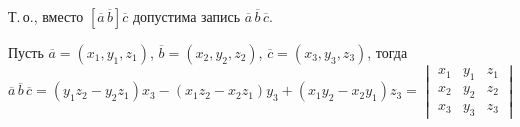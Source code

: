 Т.\,о., вместо $[\overline a\,\overline b] \overline c$ допустима запись $\overline a\,\overline b\,\overline c$.

Пусть $\overline a = (x_1, y_1, z_1)$, $\overline b = (x_2, y_2, z_2)$, $\overline c = (x_3, y_3, z_3)$, тогда
\begin{equation*}
\overline a\,\overline b\,\overline c =
(y_1 z_2 - y_2 z_1) x_3 - (x_1 z_2 - x_2 z_1) y_3 + (x_1 y_2 - x_2 y_1) z_3 =
\begin{vmatrix}
x_1 & y_1 & z_1 \\
x_2 & y_2 & z_2 \\
x_3 & y_3 & z_3
\end{vmatrix}
\end{equation*}